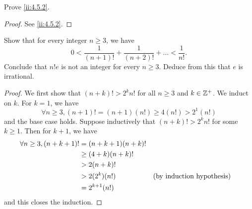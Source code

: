 \exercisesection

\begin{ex}\label{ii:ex:4.5.1}
  Prove \cref{ii:4.5.2}.
\end{ex}

\begin{proof}
  See \cref{ii:4.5.2}.
\end{proof}

\begin{ex}\label{ii:ex:4.5.2}
  Show that for every integer \(n \geq 3\), we have
  \[
    0 < \dfrac{1}{(n + 1)!} + \dfrac{1}{(n + 2)!} + \dots < \dfrac{1}{n!}.
  \]
  Conclude that \(n! e\) is not an integer for every \(n \geq 3\).
  Deduce from this that \(e\) is irrational.
\end{ex}

\begin{proof}
  We first show that \((n + k)! > 2^k n!\) for all \(n \geq 3\) and \(k \in \mathbb{Z}^+\).
  We induct on \(k\).
  For \(k = 1\), we have
  \[
    \forall n \geq 3, (n + 1)! = (n + 1) (n!) \geq 4 (n!) > 2^1 (n!)
  \]
  and the base case holds.
  Suppose inductively that \((n + k)! > 2^k n!\) for some \(k \geq 1\).
  Then for \(k + 1\), we have
  \begin{align*}
    \forall n \geq 3, (n + k + 1)! & = (n + k + 1) (n + k)!            \\
                                   & \geq (4 + k)(n + k)!              \\
                                   & > 2 (n + k)!                      \\
                                   & > 2 (2^k) (n!)         &  & \text{(by induction hypothesis)} \\
                                   & = 2^{k + 1} (n!)
  \end{align*}
  and this closes the induction.


\end{proof}
